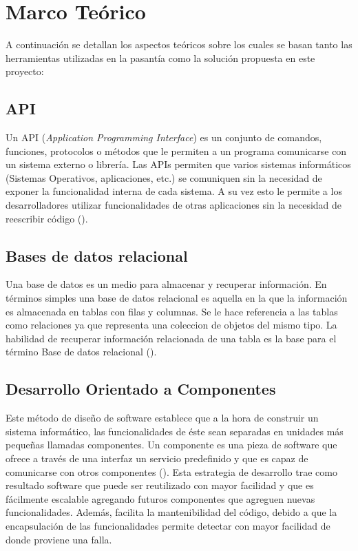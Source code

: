 \chapter{Marco Teórico}
\label{capitulo2}

A continuación se detallan los aspectos teóricos sobre los cuales se basan
tanto las herramientas utilizadas en la pasantía como la solución propuesta
en este proyecto:

\section{API}
Un API (\emph{Application Programming Interface}) es un conjunto de comandos,
funciones, protocolos o métodos que le permiten a un programa comunicarse
con un sistema externo o librería. Las APIs permiten que varios sistemas
informáticos (Sistemas Operativos, aplicaciones, etc.) se comuniquen sin la
necesidad de exponer la funcionalidad interna de cada sistema. A su vez esto
le permite a los desarrolladores utilizar funcionalidades de otras aplicaciones
sin la necesidad de reescribir código (\cite{API}).

\section{Bases de datos relacional}

Una base de datos es un medio para almacenar y recuperar información. En términos simples
una base de datos relacional es aquella en la que la información es almacenada en tablas con
filas y columnas. Se le hace referencia a las tablas como relaciones ya que representa una
coleccion de objetos del mismo tipo. La habilidad de recuperar información relacionada de una
tabla es la base para el término Base de datos relacional (\cite{RELACIONAL}).

\section{Desarrollo Orientado a Componentes}

Este método de diseño de software establece que a la hora de construir un sistema
informático, las funcionalidades de éste sean separadas en unidades más pequeñas
llamadas componentes. Un componente es una pieza de software que ofrece a través
de una interfaz un servicio predefinido y que es capaz de comunicarse con otros
componentes (\cite{COMPONENT}). Esta estrategia de desarrollo trae como resultado
software que puede ser reutilizado con mayor facilidad y que es fácilmente escalable
agregando futuros componentes que agreguen nuevas funcionalidades. Además, facilita la
mantenibilidad del código, debido a que la encapsulación de las funcionalidades permite
detectar con mayor facilidad de donde proviene una falla.

